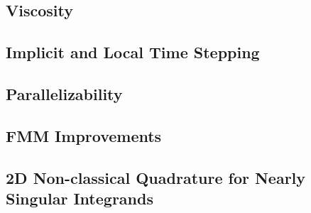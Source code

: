 \documentclass[letterpaper,12pt]{report}
\begin{document}
\subsection{Viscosity}
\newpage
\subsection{Implicit and Local Time Stepping}
\subsection{Parallelizability}
\subsection{FMM Improvements}
\subsection{2D Non-classical Quadrature for Nearly Singular Integrands}
\end{document}
